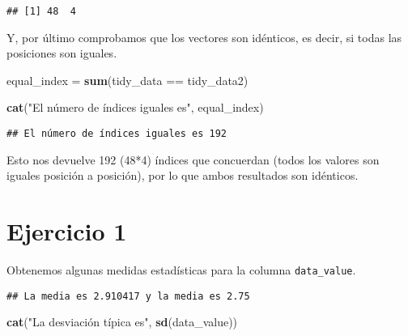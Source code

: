\documentclass[12pt,spanish,]{article}
\newenvironment{Shaded}{\begin{snugshade}}{\end{snugshade}}
\newcommand{\KeywordTok}[1]{\textcolor[rgb]{0.13,0.29,0.53}{\textbf{{#1}}}}
\newcommand{\StringTok}[1]{\textcolor[rgb]{0.31,0.60,0.02}{{#1}}}
\newcommand{\CommentTok}[1]{\textcolor[rgb]{0.56,0.35,0.01}{\textit{{#1}}}}
\newcommand{\NormalTok}[1]{{#1}}
\begin{document}
\begin{verbatim}
## [1] 48  4
\end{verbatim}

Y, por último comprobamos que los vectores son idénticos, es decir, si
todas las posiciones son iguales.

\begin{Shaded}
\begin{Highlighting}[]
\NormalTok{equal_index =}\StringTok{ }\KeywordTok{sum}\NormalTok{(tidy_data ==}\StringTok{ }\NormalTok{tidy_data2)}

\KeywordTok{cat}\NormalTok{(}\StringTok{"El número de índices iguales es"}\NormalTok{, equal_index)}
\end{Highlighting}
\end{Shaded}

\begin{verbatim}
## El número de índices iguales es 192
\end{verbatim}

Esto nos devuelve 192 (48*4) índices que concuerdan (todos los valores
son iguales posición a posición), por lo que ambos resultados son
idénticos.

\section{Ejercicio 1}\label{ejercicio-1}

Obtenemos algunas medidas estadísticas para la columna
\texttt{data\_value}.

\begin{Shaded}
\end{Shaded}

\begin{verbatim}
## La media es 2.910417 y la media es 2.75
\end{verbatim}

\begin{Shaded}
\begin{Highlighting}[]
\KeywordTok{cat}\NormalTok{(}\StringTok{"La desviación típica es"}\NormalTok{, }\KeywordTok{sd}\NormalTok{(data_value))}
\end{Highlighting}
\end{Shaded}
\end{document}
